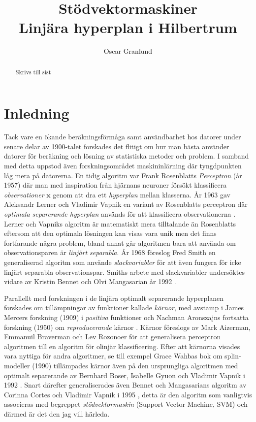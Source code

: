 \documentclass[a4paper, 12pt]{report}
\title{Stödvektormaskiner\\
{\large Linjära hyperplan i Hilbertrum}}
\author{Oscar Granlund}
\theoremstyle{definition}
\theoremstyle{remark}
\begin{document}
\maketitle

\begin{abstract}
	Skrivs till sist
\end{abstract}

\chapter{Inledning}
Tack vare en ökande beräkningsförmåga samt användbarhet hos datorer under senare delar av 1900-talet forskades det flitigt om hur man bästa använder datorer för beräkning och lösning av statistiska metoder och problem.
I samband med detta uppstod även forskningsområdet maskininlärning där tyngdpunkten låg mera på datorerna.
En tidig algoritm var Frank Rosenblatts \emph{Perceptron} (år 1957) \cite{Rosenblatt} där man med inspiration från hjärnans neuroner försökt klassificera \emph{observationer} $\mathbf{x}$ genom att dra ett \emph{hyperplan} mellan klasserna.
År 1963 gav Aleksandr Lerner och Vladimir Vapnik en variant av Rosenblatts perceptron där \emph{optimala separerande hyperplan} används för att klassificera observationerna \cite{VapnikLerner1963}.
Lerner och Vapniks algoritm är matematiskt mera tilltalande än Rosenblatts eftersom att den optimala lösningen kan visas vara unik men det finns fortfarande några problem, bland annat går algoritmen bara att använda om observationsparen är \emph{linjärt separabla}.
År 1968 föreslog Fred Smith \cite{Smith} en generaliserad algoritm som använde \emph{slackvariabler} för att även fungera för icke linjärt separabla observationspar.
Smiths arbete med slackvariabler undersöktes vidare av Kristin Bennet och Olvi Mangasarian år 1992 \cite{BennetMangasarian}.

Parallellt med forskningen i de linjära optimalt separerande hyperplanen forskades om tillämpningar av funktioner kallade \emph{kärnor}, med avstamp i James Mercers forskning (1909) i \emph{positiva} funktioner \cite{Mercer} och Nachman Aronszajns fortsatta forskning (1950) om \emph{reproducerande} kärnor \cite{Aronszajn}.
Kärnor föreslogs av Mark Aizerman, Emmanuil Braverman och Lev Rozonoer \cite{Aizerman} för att generalisera perceptron algoritmen till en algoritm för olinjär klassificering.
Efter att kärnorna visades vara nyttiga för andra algoritmer, se till exempel Grace Wahbas bok om splin-modeller (1990) \cite{Grace} tillämpades kärnor även på den ursprungliga algoritmen med optimalt separerande av Bernhard Boser, Isabelle Gyuon och Vladimir Vapnik i 1992 \cite{BoserGyuonVapnik}.
Snart därefter generaliserades även Bennet och Mangasarians algoritm av Corinna Cortes och Vladimir Vapnik i 1995 \cite{CortesVapnik}, detta är den algoritm som vanligtvis associeras med begreppet \emph{stödvektormaskin} (Support Vector Machine, SVM) och därmed är det den jag vill härleda.
\end{document}
